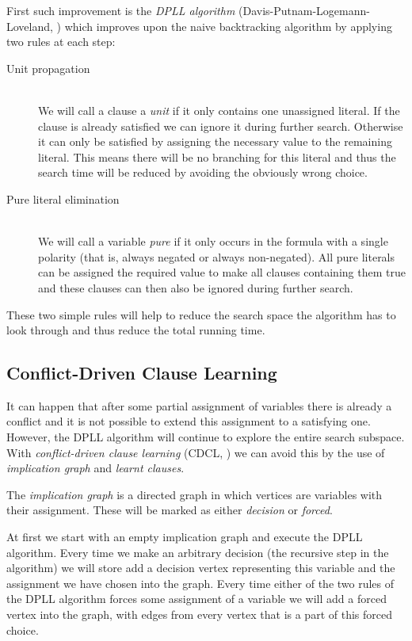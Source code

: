First such improvement is the \emph{DPLL algorithm} (Davis-Putnam-Logemann-Loveland, \citep{davis1960computing,davis1962machine}) which improves upon the naive backtracking algorithm by applying two rules at each step:

\begin{description}
\item[Unit propagation] \hfill \\
We will call a clause a \emph{unit} if it only contains one unassigned literal.
If the clause is already satisfied we can ignore it during further search.
Otherwise it can only be satisfied by assigning the necessary value to the remaining literal.
This means there will be no branching for this literal and thus the search time will be reduced by avoiding the obviously wrong choice.

\item[Pure literal elimination] \hfill \\
We will call a variable \emph{pure} if it only occurs in the formula with a single polarity (that is, always negated or always non-negated).
All pure literals can be assigned the required value to make all clauses containing them true and these clauses can then also be ignored during further search.
\end{description}

These two simple rules will help to reduce the search space the algorithm has to look through and thus reduce the total running time.

\subsection{Conflict-Driven Clause Learning}

It can happen that after some partial assignment of variables there is already a conflict and it is not possible to extend this assignment to a satisfying one.
However, the DPLL algorithm will continue to explore the entire search subspace.
With \emph{conflict-driven clause learning} (CDCL, \citep{bayardo1997using,marques1999grasp}) we can avoid this by the use of \emph{implication graph} and \emph{learnt clauses}.

The \emph{implication graph} is a directed graph in which vertices are variables with their assignment.
These will be marked as either \emph{decision} or \emph{forced}.

At first we start with an empty implication graph and execute the DPLL algorithm.
Every time we make an arbitrary decision (the recursive step in the algorithm) we will store add a decision vertex representing this variable and the assignment we have chosen into the graph.
Every time either of the two rules of the DPLL algorithm forces some assignment of a variable we will add a forced vertex into the graph, with edges from every vertex that is a part of this forced choice.

